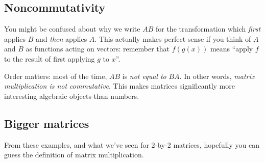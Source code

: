 \documentclass{article}
\begin{document}
\subsection{Noncommutativity}


\begin{Remark}
You might be confused about why we write \(AB\) for the
transformation which {\em first} applies \(B\) and {\em then}
applies \(A\). This actually makes perfect sense if you think of
\(A\) and \(B\) as functions acting on vectors: remember that
\(f(g(x))\) means ``apply \(f\) to the result of first applying
\(g\) to \(x\)''.


\end{Remark}
\begin{Remark}
Order matters: most of the time, \(AB\) is {\em not equal to}
\(BA\). In other words, {\em matrix multiplication is not
commutative}. This makes matrices significantly more interesting
algebraic objects than numbers.


\end{Remark}
\subsection{Bigger matrices}
From these examples, and what we've seen for 2-by-2 matrices,
hopefully you can guess the definition of matrix multiplication.
\end{document}
